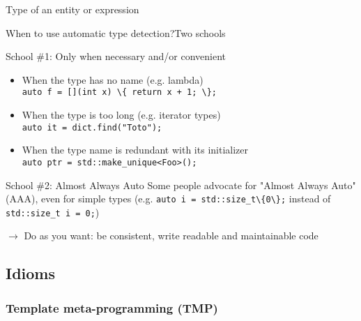 \begin{frame}{Type of an entity or expression}{}
  \begin{example}
  \end{example}
\end{frame}

\begin{frame}{When to use automatic type detection?}{Two schools}
  \begin{block}{School \#1: Only when necessary and/or convenient}
    \begin{itemize}
    \item
      When the type has no name (e.g. lambda) \\
      \lstinline!auto f = [](int x) \{ return x + 1; \};!
    \item
      When the type is too long (e.g. iterator types) \\
      \lstinline!auto it = dict.find("Toto");!
    \item
      When the type name is redundant with its initializer \\
      \lstinline!auto ptr = std::make_unique<Foo>();!
    \end{itemize}
  \end{block}
  \begin{block}{School \#2: Almost Always Auto}
    Some people advocate for "Almost Always Auto" (AAA), even for simple types
    (e.g. \lstinline!auto i = std::size_t\{0\};! instead of \lstinline!std::size_t i = 0;!)
  \end{block}
  $\to$ Do as you want: be consistent, write readable and maintainable code
\end{frame}


\subsection{Idioms}

\subsubsection{Template meta-programming (TMP)}

